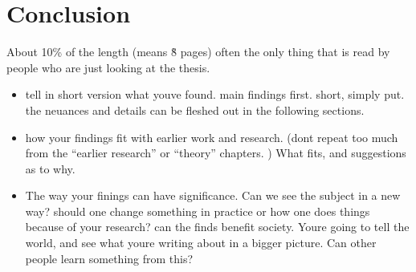 \chapter{Conclusion}
{\color{red}About 10\% of the length (means \~8 pages)
often the only thing that is read by people who are just looking at the thesis.
\begin{itemize}
\item tell in short version what youve found. main findings first. short, simply put. the neuances and details can be fleshed out in the following sections.
\item how your findings fit with earlier work and research. (dont repeat too much from the ``earlier research'' or ``theory'' chapters. ) What fits, and suggestions as to why.
\item The way your finings can have significance. Can we see the subject in a new way? should one change something in practice or how one does things because of your research? can the finds benefit society. Youre going to tell the world, and see what youre writing about in a bigger picture. Can other people learn something from this?
\end{itemize}
}
